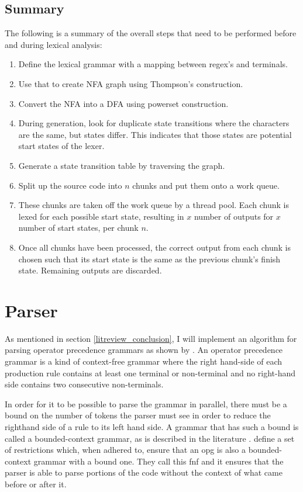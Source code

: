 \subsection{Summary}
The following is a summary of the overall steps that need to be performed before
and during lexical analysis:

\begin{enumerate}
	\item Define the lexical grammar with a mapping between regex's and terminals.
	\item Use that to create NFA graph using Thompson's construction.
	\item Convert the NFA into a DFA using powerset construction.
	\item During generation, look for duplicate state transitions where the
		  characters are the same, but states differ. This indicates that those
		  states are potential start states of the lexer.
	\item Generate a state transition table by traversing the graph.
	\item Split up the source code into $n$ chunks and put them onto a work queue.
	\item These chunks are taken off the work queue by a thread pool. Each chunk
		  is lexed for each possible start state, resulting in $x$ number of outputs for $x$
		  number of start states, per chunk $n$.
	\item Once all chunks have been processed, the correct output from each chunk is
		  chosen such that its start state is the same as the previous chunk's finish
    	  state. Remaining outputs are discarded.
\end{enumerate}

\section{Parser} \label{design_parser}

As mentioned in section \ref{litreview_conclusion}, I will implement
an algorithm for parsing operator precedence grammars as shown by
\cite{barenghi_parallel_2015}. An operator precedence grammar is a kind of
context-free grammar where the right hand-side of each production rule contains
at least one terminal or non-terminal and no right-hand side contains two
consecutive non-terminals. 

In order for it to be possible to parse the grammar in parallel, there must
be a bound on the number of tokens the parser must see in order to reduce
the righthand side of a rule to its left hand side. A grammar that has such a
bound is called a bounded-context grammar, as is described in the literature
\citep{grune_parsing_2008}. \cite{barenghi_parallel_2015} define a set of
restrictions which, when adhered to, ensure that an \gls{opg} is also a
bounded-context grammar with a bound one. They call this \gls{fnf} and it
ensures that the parser is able to parse portions of the code without the
context of what came before or after it.

